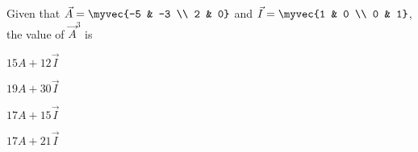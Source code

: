 \item Given that $\vec{A}=\myvec{-5 & -3 \\ 2 & 0}$ and $\vec{I}=\myvec{1 & 0 \\ 0 & 1}$, the value of $\vec{A}^{3}$ is
\hfill{}
\begin{enumerate}
    \begin{multicols}{4}
    \item $15A+12 \vec{I}$
    \item $19 A+30 \vec{I}$
    \item $17A+15 \vec{I}$
    \item $17A+21 \vec{I}$
    \end{multicols}
\end{enumerate}

